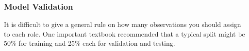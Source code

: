 \documentclass[PredictiveAnalytics101.tex]{subfiles}
\begin{document}
	\begin{frame}
		\frametitle{Model Validation}
		\Large
		It is difficult to give a general rule on how many observations you should assign to each role. One important textbook recommended that a typical split might be 50\% for training and 25\% each for validation and testing.
		
		
	\end{frame}
\end{document}
